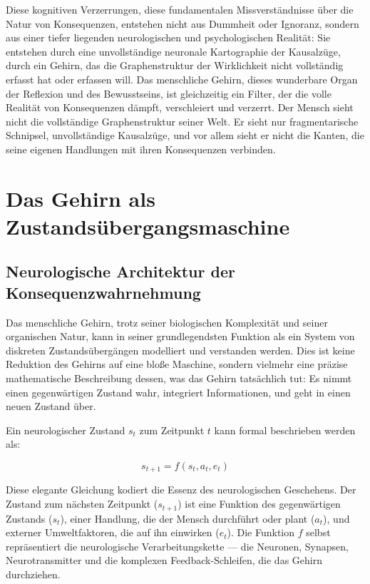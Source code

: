 \documentclass[12pt,a4paper]{article}
\begin{document}
Diese kognitiven Verzerrungen, diese fundamentalen Missverständnisse über die Natur von Konsequenzen, entstehen nicht aus Dummheit oder Ignoranz, sondern aus einer tiefer liegenden neurologischen und psychologischen Realität: Sie entstehen durch eine unvollständige neuronale Kartographie der Kausalzüge, durch ein Gehirn, das die Graphenstruktur der Wirklichkeit nicht vollständig erfasst hat oder erfassen will. Das menschliche Gehirn, dieses wunderbare Organ der Reflexion und des Bewusstseins, ist gleichzeitig ein Filter, der die volle Realität von Konsequenzen dämpft, verschleiert und verzerrt. Der Mensch sieht nicht die vollständige Graphenstruktur seiner Welt. Er sieht nur fragmentarische Schnipsel, unvollständige Kausalzüge, und vor allem sieht er nicht die Kanten, die seine eigenen Handlungen mit ihren Konsequenzen verbinden.

\section{Das Gehirn als Zustandsübergangsmaschine}

\subsection{Neurologische Architektur der Konsequenzwahrnehmung}

Das menschliche Gehirn, trotz seiner biologischen Komplexität und seiner organischen Natur, kann in seiner grundlegendsten Funktion als ein System von diskreten Zustandsübergängen modelliert und verstanden werden. Dies ist keine Reduktion des Gehirns auf eine bloße Maschine, sondern vielmehr eine präzise mathematische Beschreibung dessen, was das Gehirn tatsächlich tut: Es nimmt einen gegenwärtigen Zustand wahr, integriert Informationen, und geht in einen neuen Zustand über.

Ein neurologischer Zustand $s_t$ zum Zeitpunkt $t$ kann formal beschrieben werden als:

\begin{equation}
s_{t+1} = f(s_t, a_t, e_t)
\end{equation}

Diese elegante Gleichung kodiert die Essenz des neurologischen Geschehens. Der Zustand zum nächsten Zeitpunkt ($s_{t+1}$) ist eine Funktion des gegenwärtigen Zustands ($s_t$), einer Handlung, die der Mensch durchführt oder plant ($a_t$), und externer Umweltfaktoren, die auf ihn einwirken ($e_t$). Die Funktion $f$ selbst repräsentiert die neurologische Verarbeitungskette — die Neuronen, Synapsen, Neurotransmitter und die komplexen Feedback-Schleifen, die das Gehirn durchziehen.
\end{document}
